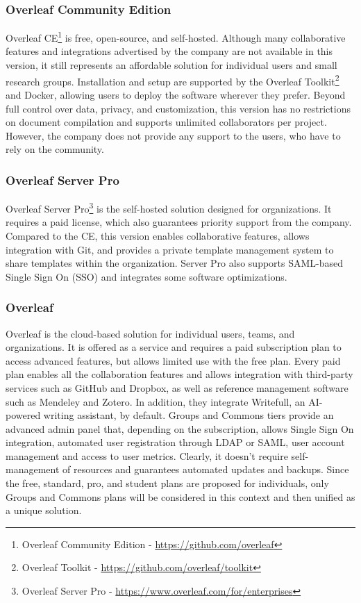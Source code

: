 \subsubsection{Overleaf Community Edition}
Overleaf CE\footnote{Overleaf Community Edition - \href{https://github.com/overleaf/overleaf/tree/main}{https://github.com/overleaf}} is free, open-source, and self-hosted. Although many collaborative features and integrations advertised by the company are not available in this version, it still represents an affordable solution for individual users and small research groups. Installation and setup are supported by the Overleaf Toolkit\footnote{Overleaf Toolkit - \href{https://github.com/overleaf/toolkit}{https://github.com/overleaf/toolkit}} and Docker, allowing users to deploy the software wherever they prefer. Beyond full control over data, privacy, and customization, this version has no restrictions on document compilation and supports unlimited collaborators per project. However, the company does not provide any support to the users, who have to rely on the community. 

\subsubsection{Overleaf Server Pro}
Overleaf Server Pro\footnote{Overleaf Server Pro - \href{https://www.overleaf.com/for/enterprises}{https://www.overleaf.com/for/enterprises}} is the self-hosted solution designed for organizations. It requires a paid license, which also guarantees priority support from the company. Compared to the CE, this version enables collaborative features, allows integration with Git, and provides a private template management system to share templates within the organization. Server Pro also supports SAML-based Single Sign On (SSO) and integrates some software optimizations.

\subsubsection{Overleaf}
Overleaf is the cloud-based solution for individual users, teams, and organizations. It is offered as a service and requires a paid subscription plan to access advanced features, but allows limited use with the free plan. Every paid plan enables all the collaboration features and allows integration with third-party services such as GitHub and Dropbox, as well as reference management software such as Mendeley and Zotero. In addition, they integrate Writefull, an AI-powered writing assistant, by default.
Groups and Commons tiers provide an advanced admin panel that, depending on the subscription, allows Single Sign On integration, automated user registration through LDAP or SAML, user account management and access to user metrics. Clearly, it doesn't require self-management of resources and guarantees automated updates and backups.
Since the free, standard, pro, and student plans are proposed for individuals, only Groups and Commons plans will be considered in this context and then unified as a unique solution.

